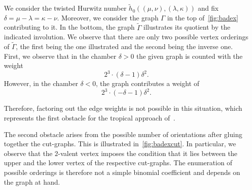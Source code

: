 \begin{exam}
We consider the twisted Hurwitz number $\tilde{h}_0((\mu,\nu),(\lambda,\kappa))$ and fix $\delta=\mu-\lambda=\kappa-\nu$. Moreover, we consider the graph $\Gamma$ in the top of~\cref{fig:badex} contributing to it. In the bottom, the graph $\tilde{\Gamma}$ illustrates its quotient by the indicated involution. We observe that there are only two possible vertex orderings of $\tilde{\Gamma}$, the first being the one illustrated and the second being the inverse one. First, we observe that in the chamber $\delta>0$ the given graph is counted with the weight
\begin{equation*}
    2^3\cdot (\delta-1)\delta^2.
\end{equation*}
However, in the chamber $\delta<0$, the graph contributes a weight of
\begin{equation*}
        2^3\cdot (-\delta-1)\delta^2.
\end{equation*}

Therefore, factoring out the edge weights is not possible in this situation, which represents the first obstacle for the tropical approach of~\cite{CJM11}.

The second obstacle arises from the possible number of orientations after gluing together the cut-graphs. This is illustrated in~\cref{fig:badexcut}. In particular, we observe that the $2$-valent vertex imposes the condition that it lies between the upper and the lower vertex of the respective cut-graphs. The enumeration of possible orderings is therefore not a simple binomial coefficient and depends on the graph at hand.
\end{exam}

